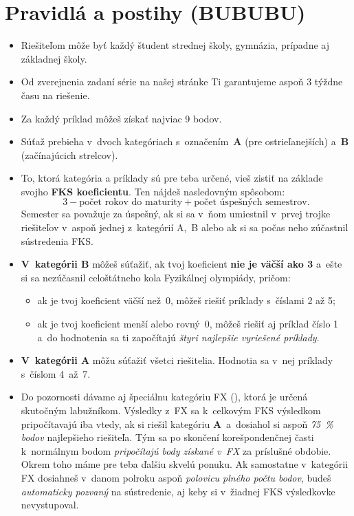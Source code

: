 \pagestyle{rules}

\section{Pravidlá a postihy (BUBUBU)}
\begin{itemize}
	\item Riešiteľom môže byť každý študent strednej školy, gymnázia, prípadne aj základnej školy.
	
	\item Od zverejnenia zadaní série na našej stránke Ti garantujeme aspoň 3 týždne času na riešenie.

	\item Za každý príklad môžeš získať najviac 9 bodov. 

	\item Súťaž prebieha v~dvoch kategóriach s~označením~\textbf{A} (pre ostrieľanejších) a~\textbf{B} (začínajúcich strelcov).

	\item To, ktorá kategória a príklady sú pre teba určené, vieš zistiť na základe svojho \textbf{FKS koeficientu}. 
		Ten nájdeš nasledovným spôsobom:
		$$3 - \text{počet rokov do maturity} + \text{počet úspešných semestrov.}$$
		Semester sa považuje za úspešný, ak si sa v~ňom umiestnil v~prvej trojke riešiteľov v~aspoň jednej z~kategórií A,~B 
		alebo ak si sa počas neho zúčastnil sústredenia FKS.
    
	\item \textbf{V~kategórii B} môžeš súťažiť, ak tvoj koeficient \textbf{nie je väčší ako 3} 
		a~ešte si sa nezúčasnil celoštátneho kola Fyzikálnej olympiády, pričom:
		\begin{itemize}
			\item ak je tvoj koeficient väčší než~0, môžeš riešiť príklady s~číslami 2 až 5;
			\item ak je tvoj koeficient menší alebo rovný~0, môžeš riešiť aj príklad číslo 1 a~do hodnotenia sa ti započítajú \emph{štyri najlepšie vyriešené príklady}.
		\end{itemize}

	\item \textbf{V~kategórii A} môžu súťažiť všetci riešitelia. Hodnotia sa v~nej príklady s~číslom 4~až~7.

	\item Do pozornosti dávame aj špeciálnu kategóriu FX (),
		ktorá je určená skutočným labužníkom. Výsledky z~FX sa k~celkovým FKS výsledkom 
		pripočítavajú iba vtedy, ak si riešil kategóriu \textbf{A}~a~dosiahol si aspoň \emph{\SI{75}{\percent} bodov} najlepšieho riešiteľa.
		Tým sa po skončení korešpondenčnej časti k~normálnym bodom \emph{pripočítajú body
		získané v~FX} za príslušné obdobie. Okrem toho máme pre teba ďalšiu skvelú ponuku.
		Ak samostatne v~kategórii FX dosiahneš v~danom polroku aspoň \emph{polovicu plného počtu
		bodov}, budeš \emph{automaticky pozvaný} na sústredenie, aj keby si v~žiadnej FKS
		výsledkovke nevystupoval.


\end{itemize}
